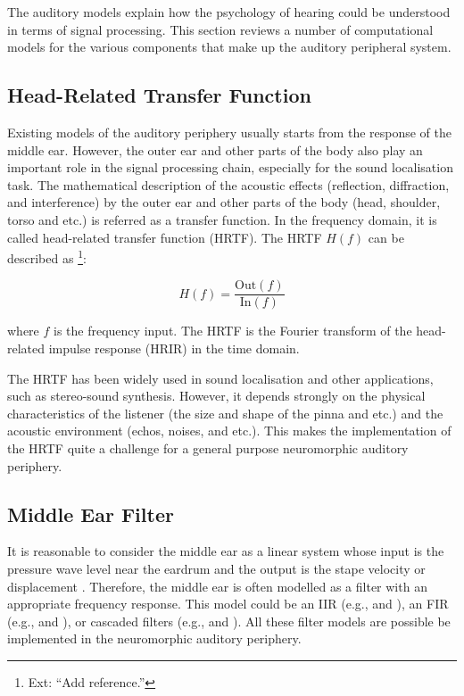 \documentclass[11pt]{article}
\begin{document}
The auditory models explain how the psychology of hearing could be
understood in terms of signal processing. This section reviews a
number of computational models for the various components that make up
the auditory peripheral system.
\subsection{Head-Related Transfer Function}
\label{sec-3-1}
\label{sec:ch2-head-related-transfer-function}

Existing models of the auditory periphery usually starts from the
response of the middle ear. However, the outer ear and other parts of the
body also play an important role in the signal processing chain,
especially for the sound localisation task. The mathematical
description of the acoustic effects (reflection, diffraction, and
interference) by the outer ear and other parts of the body (head,
shoulder, torso and etc.) is referred as a transfer function. In the
frequency domain, it is called head-related transfer function (HRTF).
The HRTF $H(f)$ can be described as \footnote{Ext: ``Add reference.'' }:


\begin{equation}
  \label{eq:HRTF}
  H(f) = \frac{\textrm{Out}(f)}{\textrm{In}(f)}
\end{equation}

where $f$ is the frequency input. The HRTF is the Fourier transform of
the head-related impulse response (HRIR) in the time domain.


The HRTF has been widely used in sound localisation and other
applications, such as stereo-sound synthesis. However, it depends
strongly on the physical characteristics of the listener (the size and
shape of the pinna and etc.) and the acoustic environment (echos,
noises, and etc.). This makes the implementation of the HRTF quite a
challenge for a general purpose neuromorphic auditory periphery.
\subsection{Middle Ear Filter}
\label{sec-3-2}
\label{sec:ch2-middle-ear-filter}

It is reasonable to consider the middle ear as a linear system whose
input is the pressure wave level near the eardrum and the output is
the stape velocity or displacement \cite{Goode1994}. Therefore, the
middle ear is often modelled as a filter with an appropriate frequency
response. This model could be an IIR (e.g., \cite{Lopez-Poveda1996} and
\cite{Tan2003}), an FIR (e.g., \cite{Lopez-Poveda2001} and
\cite{Lopez-Najera2007}), or cascaded filters (e.g.,
\cite{Sumner2003b} and \cite{Holmes2004}). All these filter models
are possible be implemented in the neuromorphic auditory periphery.
\end{document}
